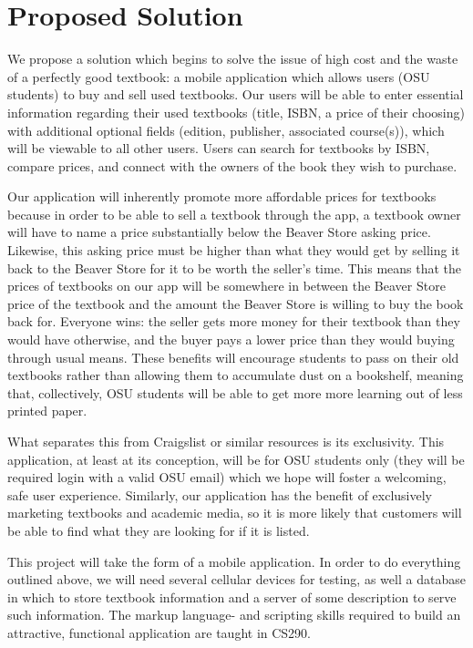 \documentclass[12pt]{article}
\begin{document}
\section{Proposed Solution}
\par We propose a solution which begins to solve the issue of high cost and the waste of a perfectly good textbook: a mobile application which allows users (OSU students) to buy and sell used textbooks. Our users will be able to enter essential information regarding their used textbooks (title, ISBN, a price of their choosing) with additional optional fields (edition, publisher, associated course(s)), which will be viewable to all other users. Users can search for textbooks by ISBN, compare prices, and connect with the owners of the book they wish to purchase. 
\par Our application will inherently promote more affordable prices for textbooks because in order to be able to sell a textbook through the app, a textbook owner will have to name a price substantially below the Beaver Store asking price. Likewise, this asking price must be higher than what they would get by selling it back to the Beaver Store for it to be worth the seller’s time. This means that the prices of textbooks on our app will be somewhere in between the Beaver Store price of the textbook and the amount the Beaver Store is willing to buy the book back for. Everyone wins: the seller gets more money for their textbook than they would have otherwise, and the buyer pays a lower price than they would buying through usual means. These benefits will encourage students to pass on their old textbooks rather than allowing them to accumulate dust on a bookshelf, meaning that, collectively, OSU students will be able to get more more learning out of less printed paper. 
\par What separates this from Craigslist or similar resources is its exclusivity. This application, at least at its conception, will be for OSU students only (they will be required login with a valid OSU email) which we hope will foster a welcoming, safe user experience. Similarly, our application has the benefit of exclusively marketing textbooks and academic media, so it is more likely that customers will be able to find what they are looking for if it is listed. 
\par This project will take the form of a mobile application. In order to do everything outlined above, we will need several cellular devices for testing, as well a database in which to store textbook information and a server of some description to serve such information. The markup language- and scripting skills required to build an attractive, functional application are taught in CS290. 
\end{document}

